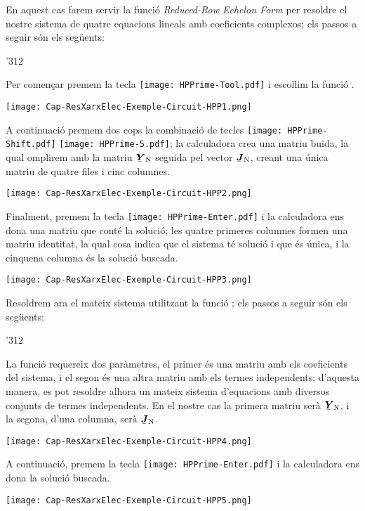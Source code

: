 \begin{exemple}
    En aquest cas farem servir la funció  \textit{Reduced-Row Echelon Form} per resoldre el nostre sistema de quatre equacions lineals amb coeficients complexos; els passos a seguir són els següents:

    \begin{dingautolist}{'312}
         \item Per començar premem la tecla \texttt{[image: HPPrime-Tool.pdf]} i escollim la funció .

             \texttt{[image: Cap-ResXarxElec-Exemple-Circuit-HPP1.png]}
         \item A continuació premem dos cops la combinació de tecles  \texttt{[image: HPPrime-Shift.pdf]} \texttt{[image: HPPrime-5.pdf]}; la calculadora crea una matriu buida, la qual omplirem amb la matriu $\mcmplx{Y}\ped{N}$ seguida pel vector $\mcmplx{J}\ped{N}$, creant una única matriu de quatre files i cinc columnes.

             \texttt{[image: Cap-ResXarxElec-Exemple-Circuit-HPP2.png]}

         \item Finalment, premem la tecla \texttt{[image: HPPrime-Enter.pdf]} i la calculadora ens dona una matriu que conté la solució; les quatre primeres columnes formen una matriu identitat, la qual cosa indica que el sistema té solució i que és única, i la cinquena columna és la  solució buscada.

         \texttt{[image: Cap-ResXarxElec-Exemple-Circuit-HPP3.png]}
    \end{dingautolist}

    Resoldrem ara el mateix sistema utilitzant  la funció ; els passos a seguir són els següents:

    \begin{dingautolist}{'312}
         \item La funció  requereix dos paràmetres, el primer és una matriu amb els coeficients del sistema, i el segon és una altra matriu amb els termes independents; d'aquesta manera, es pot resoldre alhora un mateix sistema d'equacions amb diversos conjunts de termes independents. En el nostre cas la primera matriu serà $\mcmplx{Y}\ped{N}$, i la segona, d'una columna, serà  $\mcmplx{J}\ped{N}$.

             \texttt{[image: Cap-ResXarxElec-Exemple-Circuit-HPP4.png]}

         \item A continuació, premem la tecla \texttt{[image: HPPrime-Enter.pdf]} i la calculadora ens dona la  solució buscada.

         \texttt{[image: Cap-ResXarxElec-Exemple-Circuit-HPP5.png]}
    \end{dingautolist}
\end{exemple}


